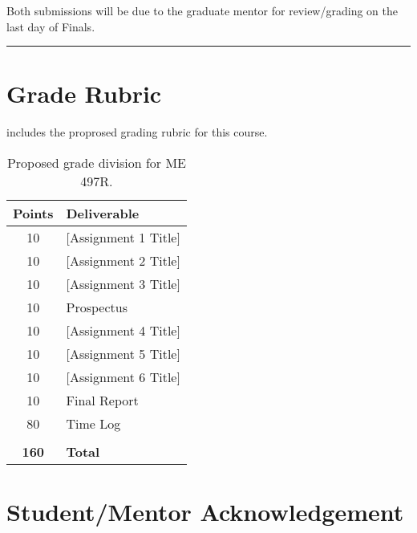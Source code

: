 \documentclass[12pt]{article}
\begin{document}
Both submissions will be due to the graduate mentor for review/grading on the last day of Finals.

\vspace{1em}\hrule\vspace{1em}





\section{Grade Rubric}
\label{sec:graderubric}

 includes the proprosed grading rubric for this course.

\begin{table}[h!]
	\caption{Proposed grade division for ME 497R. }
	\label{tab:rubric}
	\renewcommand{\arraystretch}{1.2}
	\vspace{1em}
	\begin{tabular}{c|l}
		\textbf{Points} & \textbf{Deliverable}\\ 
		\hline
		10 & [Assignment 1 Title] \\
		10 & [Assignment 2 Title] \\
		10 & [Assignment 3 Title] \\
		10 & Prospectus     \\
		10 & [Assignment 4 Title] \\
		10 & [Assignment 5 Title] \\
		10 & [Assignment 6 Title] \\
		10 & Final Report   \\
		80 & Time Log       \\
		   &                \\
		\textbf{160} & \textbf{Total} \\
		
	\end{tabular}
\end{table}

\newpage





\section{Student/Mentor Acknowledgement}
\label{sec:acknowledgement}
\end{document}
